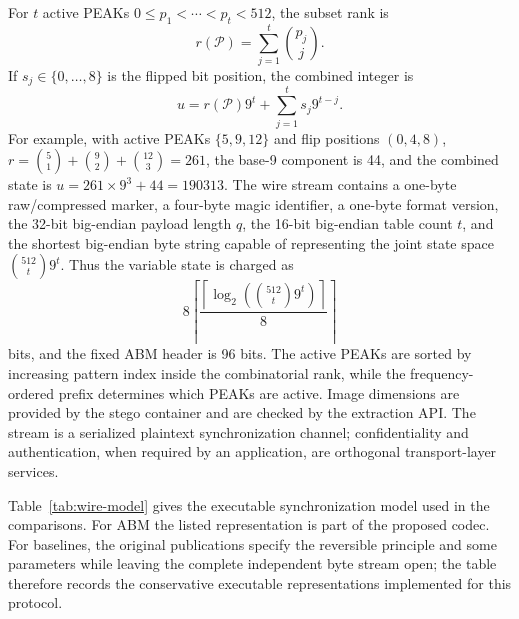 For $t$ active PEAKs $0\le p_1<\cdots<p_t<512$, the subset rank is
\begin{equation}
r(\mathcal P)=\sum_{j=1}^{t}\binom{p_j}{j}.
\label{eq:combination-rank}
\end{equation}
If $s_j\in\{0,\ldots,8\}$ is the flipped bit position, the combined integer is
\begin{equation}
u=r(\mathcal P)9^t+\sum_{j=1}^{t}s_j9^{t-j}.
\label{eq:enumerative-state}
\end{equation}
For example, with active PEAKs $\{5,9,12\}$ and flip positions $(0,4,8)$,
$r=\binom51+\binom92+\binom{12}3=261$, the base-9 component is 44, and the
combined state is $u=261\times9^3+44=190313$.
The wire stream contains a one-byte raw/compressed marker, a four-byte magic
identifier, a one-byte format version, the 32-bit big-endian payload length
$q$, the 16-bit big-endian table count $t$, and the shortest big-endian byte
string capable of representing the joint state space
$\binom{512}{t}9^t$. Thus the variable state is charged as
\begin{equation}
8\left\lceil
\frac{\left\lceil\log_2\left(\binom{512}{t}9^t\right)\right\rceil}{8}
\right\rceil
\label{eq:wire-state-bytes}
\end{equation}
bits, and the fixed ABM header is 96 bits. The active PEAKs are sorted by
increasing pattern index inside the combinatorial rank, while the
frequency-ordered prefix determines which PEAKs are active. Image dimensions
are provided by the stego container and are checked by the extraction API. The
stream is a serialized plaintext synchronization channel; confidentiality and
authentication, when required by an application, are orthogonal transport-layer
services.

Table~\ref{tab:wire-model} gives the executable synchronization model used in
the comparisons. For ABM the listed representation is part of the proposed
codec. For baselines, the original publications specify the reversible
principle and some parameters while leaving the complete independent byte
stream open; the table therefore records the conservative executable
representations implemented for this protocol.

